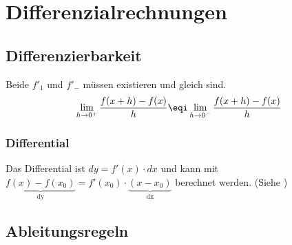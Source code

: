 \section{Differenzialrechnungen}
\subsection{Differenzierbarkeit}
Beide $f'_1$ und $f'_-$ müssen existieren und gleich sind.
\[ \lim\limits_{h \rightarrow 0^+} \frac{f(x + h) - f(x)}{h} \eqi \lim\limits_{h \rightarrow 0^-} \frac{f(x + h) - f(x)}{h} \]

\subsubsection{Differential}\label{differential}
Das Differential ist $dy = f'(x) \cdot dx$ und kann mit $\underbrace{f(x) - f(x_0)}_\text{dy} = f'(x_0) \cdot \underbrace{(x - x_0)}_\text{dx}$ berechnet werden. (Siehe )

\subsection{Ableitungsregeln }


